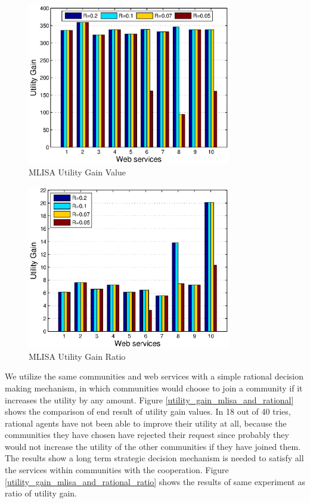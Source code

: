 \documentclass[10pt,journal,cspaper,compsoc]{IEEEtran}
\begin{document}
\begin{figure}%
\centering
\includegraphics[width=3.5in]{figures/utility_gain_r.eps}
\caption{MLISA Utility Gain Value}
\label{utility_gain_value}
\end{figure}

\begin{figure}%
\centering
\includegraphics[width=3.5in]{figures/utility_ratio_r.eps}
\caption{MLISA Utility Gain Ratio}
\label{utility_gain_ratio}
\end{figure}

We utilize the same communities and web services with a simple rational decision making mechanism, in which communities would choose to join a community if it increases the utility by any amount. Figure \ref{utility_gain_mlisa_and_rational} shows the comparison of end result of utility gain values. In 18 out of 40 tries, rational agents have not been able to improve their utility at all, because the communities they have chosen have rejected their request since probably they would not increase the utility of the other communities if they have joined them. The results show a long term strategic decision mechanism is needed to satisfy all the services within communities with the cooperation. Figure \ref{utility_gain_mlisa_and_rational_ratio} shows the results of same experiment as ratio of utility gain.
\end{document}
